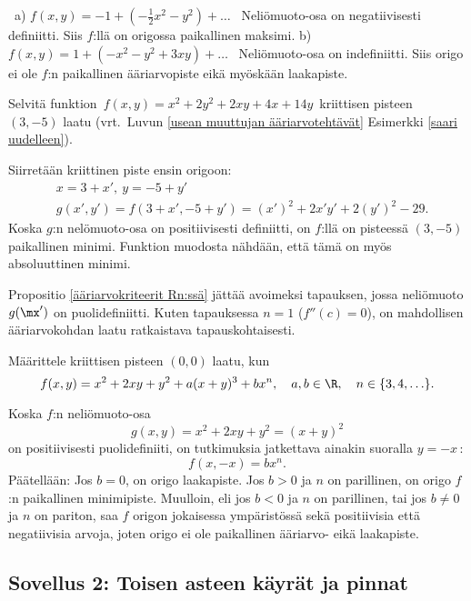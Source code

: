 \ratk \ a) $f(x,y)=-1+(-\frac{1}{2}x^2-y^2)+\ldots$ \ Neliömuoto-osa on negatiivisesti
definiitti. Siis $f$:llä on origossa paikallinen maksimi. \vspace{1mm}\newline
b) $\displaystyle{f(x,y)=1+(-x^2-y^2+3xy)+\ldots}$ \ Neliömuoto-osa on indefiniitti. Siis
origo ei ole $f$:n paikallinen ääriarvopiste eikä myöskään laakapiste. \loppu
\begin{Exa}
Selvitä funktion $\,f(x,y)=x^2+2y^2+2xy+4x+14y\,$ kriittisen pisteen $(3,-5)$ laatu 
(vrt.\ Luvun \ref{usean muuttujan ääriarvotehtävät} Esimerkki \ref{saari uudelleen}).
\end{Exa}
\ratk Siirretään kriittinen piste ensin origoon:
\begin{align*}
&x=3+x',\ y=-5+y' \\
&g(x',y')=f(3+x',-5+y') = (x')^2+2x'y'+2(y')^2-29.
\end{align*}
Koska $g$:n nelömuoto-osa on positiivisesti definiitti, on $f$:llä on pisteessä $(3,-5)$ 
paikallinen minimi. Funktion muodosta nähdään, että tämä on myös absoluuttinen minimi. \loppu

Propositio \ref{ääriarvokriteerit Rn:ssä} jättää avoimeksi tapauksen, jossa neliömuoto $g(\mx')$
on puolidefiniitti. Kuten tapauksessa $n=1$ ($f''(c)=0$), on mahdollisen ääriarvokohdan laatu 
ratkaistava tapauskohtaisesti.
\begin{Exa}
Määrittele kriittisen pisteen $(0,0)$ laatu, kun
\[
f(x,y)=x^2+2xy+y^2+a(x+y)^3+bx^n,\quad a,b\in\R,\quad n\in\{3,4,\ldots\}.
\]
\end{Exa}
\ratk Koska $f$:n neliömuoto-osa
\[
g(x,y)=x^2+2xy+y^2=(x+y)^2
\]
on positiivisesti puolidefiniiti, on tutkimuksia jatkettava ainakin suoralla $y=-x$\,:
\[
f(x,-x)=bx^n.
\]
Päätellään: Jos $b=0$, on origo laakapiste. Jos $b>0$ ja $n$ on parillinen, on origo $f$:n 
paikallinen minimipiste. Muulloin, eli jos $b<0$ ja $n$ on parillinen, tai jos $b \neq 0$ ja
$n$ on pariton, saa $f$ origon jokaisessa ympäristössä sekä positiivisia että negatiivisia
arvoja, joten origo ei ole paikallinen ääriarvo- eikä laakapiste. \loppu

\subsection*{Sovellus 2: Toisen asteen käyrät ja pinnat}
 

